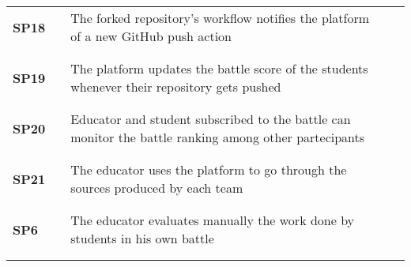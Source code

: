\begin{longtable}[H]{l l p{8.5cm} l l}
    \textbf{SP18}  & \vline & The forked repository's workflow notifies the platform of a new GitHub push action                                              & \vline &                        \\
                   &        &                                                                                                                                 &        &                        \\\hline & & & & \\
    \textbf{SP19}  & \vline & The platform updates the battle score of the students whenever their repository gets pushed                                     & \vline &                        \\
                   &        &                                                                                                                                 &        &                        \\\hline & & & & \\
    \textbf{SP20}  & \vline & Educator and student subscribed to the battle can monitor the battle ranking among other partecipants                           & \vline &                        \\
                   &        &                                                                                                                                 &        &                        \\\hline & & & & \\
    \textbf{SP21}  & \vline & The educator uses the platform to go through the sources produced by each team                                                  & \vline &                        \\
                   &        &                                                                                                                                 &        &                        \\\hline & & & & \\
    \textbf{SP6}   & \vline & The educator evaluates manually the work done by students in his own battle                                                     & \vline &                        \\
                   &        &                                                                                                                                 &        &                        \\\hline & & & & \\

\end{longtable}
